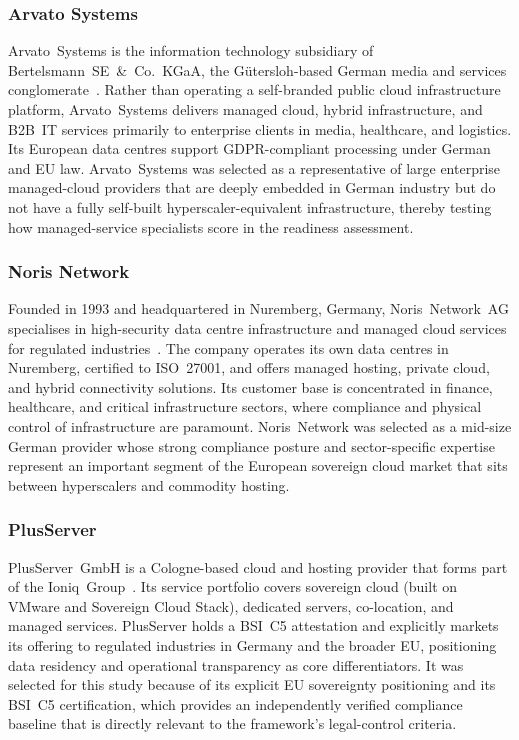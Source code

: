 \subsubsection{Arvato Systems}

Arvato~Systems is the information technology subsidiary of Bertelsmann~SE~\&~Co.~KGaA, the Gütersloh-based German media and services conglomerate~\cite{Arvato_About}. Rather than operating a self-branded public cloud infrastructure platform, Arvato~Systems delivers managed cloud, hybrid infrastructure, and B2B~IT services primarily to enterprise clients in media, healthcare, and logistics. Its European data centres support GDPR-compliant processing under German and EU law. Arvato~Systems was selected as a representative of large enterprise managed-cloud providers that are deeply embedded in German industry but do not have a fully self-built hyperscaler-equivalent infrastructure, thereby testing how managed-service specialists score in the readiness assessment.

\subsubsection{Noris Network}

Founded in 1993 and headquartered in Nuremberg, Germany, Noris~Network~AG specialises in high-security data centre infrastructure and managed cloud services for regulated industries~\cite{NorisNetwork_About}. The company operates its own data centres in Nuremberg, certified to ISO~27001, and offers managed hosting, private cloud, and hybrid connectivity solutions. Its customer base is concentrated in finance, healthcare, and critical infrastructure sectors, where compliance and physical control of infrastructure are paramount. Noris~Network was selected as a mid-size German provider whose strong compliance posture and sector-specific expertise represent an important segment of the European sovereign cloud market that sits between hyperscalers and commodity hosting.

\subsubsection{PlusServer}

PlusServer~GmbH is a Cologne-based cloud and hosting provider that forms part of the Ioniq~Group~\cite{PlusServer_About}. Its service portfolio covers sovereign cloud (built on VMware and Sovereign Cloud Stack), dedicated servers, co-location, and managed services. PlusServer holds a BSI~C5 attestation and explicitly markets its offering to regulated industries in Germany and the broader EU, positioning data residency and operational transparency as core differentiators. It was selected for this study because of its explicit EU sovereignty positioning and its BSI~C5 certification, which provides an independently verified compliance baseline that is directly relevant to the framework's legal-control criteria.

